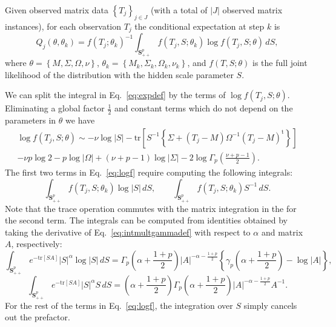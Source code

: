 \documentclass[english,listof=totoc]{scrartcl}
\begin{document}
Given observed matrix data $\left\{T_j\right\}_{j\in J}$ (with a total
of $|J|$ observed matrix instances), for each observation $T_j$ the
conditional expectation at step $k$ is
%
\begin{equation}
Q_j(\theta,\theta_k)=f(T_j;\theta_k)^{-1}\int_{\mathbf{S}_{++}^p}%
f(T_{j},S;\theta_k)\log f\left(T_{j},S;\theta\right)\,dS%
,\label{eq:expdef}
\end{equation}
where $\theta=\left\{M,\Sigma,\Omega,\nu\right\}$,
$\theta_k=\left\{M_k,\Sigma_k,\Omega_k,\nu_k\right\}$, and
$f(T,S;\theta)$ is the full joint likelihood of the distribution with
the hidden scale parameter $S$.

We can split the integral in Eq.~\eqref{eq:expdef} by the terms of
$\log f(T_{j},S;\theta)$. Eliminating a global factor $\frac{1}{2}$
and constant terms which do not depend on the parameters in $\theta$
we have
\begin{equation}
\begin{split}\log f(T_{j},S;\theta)\sim -\nu\log|S|-\textrm{tr}\left[S^{-1}\left\{\Sigma+(T_j-M)\Omega^{-1}(T_j-M)^{\textrm{t}}\right\}\right]\\
-\nu p\log2-p\log |\Omega|+(\nu+p-1)\log |\Sigma|-2\log\Gamma_{p}\left(\frac{\nu+p-1}{2}\right).
\end{split}\label{eq:logf}
\end{equation}
The first two terms in Eq.~\ref{eq:logf} require computing the
following integrals:
\begin{equation}
\int_{\mathbf{S}_{++}^p}f(T_j,S;\theta_k)\log |S|\,dS, \qquad
\int_{\mathbf{S}_{++}^p}f(T_j,S;\theta_k) S^{-1}\,dS.
\end{equation}
Note that the trace operation commutes with the matrix integration in
the for the second term.  The integrals can be computed from
identities obtained by taking the derivative of
Eq.~\eqref{eq:intmultgammadef} with respect to $\alpha$ and matrix
$A$, respectively:
%
\begin{equation}
\int_{\mathbf{S}_{++}^p}e^{-\textrm{tr}\left[SA\right]}|S|^{\alpha}\log |S|\,dS=\Gamma_{p}\left(\alpha+\frac{1+p}{2}\right)|A|^{-\alpha-\frac{1+p}{2}}\left\{\gamma_{p}\left(\alpha+\frac{1+p}{2}\right)-\log |A|\right\},\label{eq:intderivative1}
\end{equation}
\begin{equation}
\int_{\mathbf{S}_{++}^p}e^{-\textrm{tr}\left[SA\right]}|S|^{\alpha}S\,dS=\left(\alpha+\frac{1+p}{2}\right)\Gamma_{p}\left(\alpha+\frac{1+p}{2}\right)|A|^{-\alpha-\frac{1+p}{2}}A^{-1}.\label{eq:intderivative2}
\end{equation}
For the rest of the terms in Eq.~\eqref{eq:logf}, the integration over
$S$ simply cancels out the prefactor.
\end{document}
